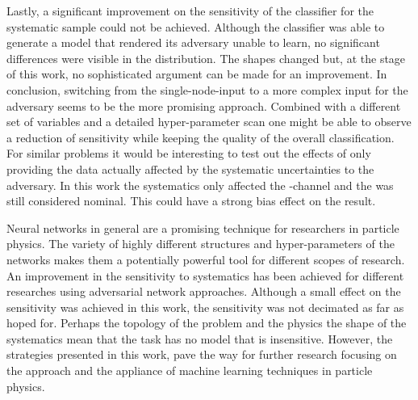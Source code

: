 Lastly, a significant improvement on the sensitivity of the classifier for the systematic sample could not be achieved. Although the classifier was able to generate a model that rendered its adversary unable to learn, no significant differences were visible in the distribution. The shapes changed but, at the stage of this work, no sophisticated argument can be made for an improvement. In conclusion, switching from the single-node-input to a more complex input for the adversary seems to be the more promising approach. Combined with a different set of variables and a detailed hyper-parameter scan one might be able to observe a reduction of sensitivity while keeping the quality of the overall classification.
For similar problems it would be interesting to test out the effects of only providing the data actually affected by the systematic uncertainties to the adversary. In this work the systematics only affected the \tW-channel and the \ttbar was still considered nominal. This could have a strong bias effect on the result.

Neural networks in general are a promising technique for researchers in particle physics. The variety of highly different structures and hyper-parameters of the networks makes them a potentially powerful tool for different scopes of research. An improvement in the sensitivity to systematics has been achieved for different researches using adversarial network approaches. Although a small effect on the sensitivity was achieved in this work, the sensitivity was not decimated as far as hoped for. Perhaps the topology of the problem and the physics the shape of the systematics mean that the task has no model that is insensitive. However, the strategies presented in this work, pave the way for further research focusing on the approach and the appliance of machine learning techniques in particle physics.

